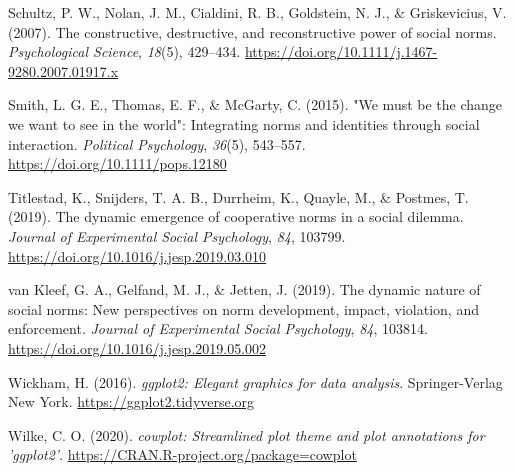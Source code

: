 \documentclass[
  man, donotrepeattitle,mask,floatsintext]{apa6}
\newlength{\cslhangindent}
\newlength{\cslentryspacingunit} %
\newenvironment{CSLReferences}[2] %
 {%
  \setlength{\parindent}{0pt}
  \ifodd #1
  \let\oldpar\par
  \def\par{\hangindent=\cslhangindent\oldpar}
  \fi
  \setlength{\parskip}{#2\cslentryspacingunit}
 }%
 {}
\begin{document}
\begin{CSLReferences}{1}{0}
\leavevmode{}%
Schultz, P. W., Nolan, J. M., Cialdini, R. B., Goldstein, N. J., \& Griskevicius, V. (2007). The constructive, destructive, and reconstructive power of social norms. \emph{Psychological Science}, \emph{18}(5), 429--434. \url{https://doi.org/10.1111/j.1467-9280.2007.01917.x}

\leavevmode{}%
Smith, L. G. E., Thomas, E. F., \& McGarty, C. (2015). "We must be the change we want to see in the world": Integrating norms and identities through social interaction. \emph{Political Psychology}, \emph{36}(5), 543--557. \url{https://doi.org/10.1111/pops.12180}

\leavevmode{}%
Titlestad, K., Snijders, T. A. B., Durrheim, K., Quayle, M., \& Postmes, T. (2019). The dynamic emergence of cooperative norms in a social dilemma. \emph{Journal of Experimental Social Psychology}, \emph{84}, 103799. \url{https://doi.org/10.1016/j.jesp.2019.03.010}

\leavevmode{}%
van Kleef, G. A., Gelfand, M. J., \& Jetten, J. (2019). The dynamic nature of social norms: New perspectives on norm development, impact, violation, and enforcement. \emph{Journal of Experimental Social Psychology}, \emph{84}, 103814. \url{https://doi.org/10.1016/j.jesp.2019.05.002}

\leavevmode{}%
Wickham, H. (2016). \emph{{ggplot2}: Elegant graphics for data analysis}. Springer-Verlag New York. \url{https://ggplot2.tidyverse.org}

\leavevmode{}%
Wilke, C. O. (2020). \emph{{cowplot}: Streamlined plot theme and plot annotations for 'ggplot2'}. \url{https://CRAN.R-project.org/package=cowplot}

\end{CSLReferences}

\endgroup

\newpage

\hypertarget{appendix-appendix}{%
\appendix}


\renewcommand{\appendixname}{\textbf{Supplementary Material}}
\renewcommand{\thefigure}{S\arabic{figure}} \setcounter{figure}{0}
\renewcommand{\thetable}{S\arabic{table}} \setcounter{table}{0}
\renewcommand{\theequation}{S\arabic{table}} \setcounter{equation}{0}

\hypertarget{section}{%
\section{}\label{section}}
\end{document}
